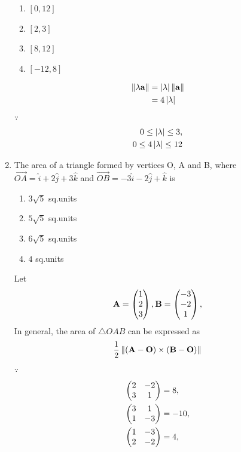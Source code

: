 \documentclass[journal,12pt,twocolumn]{IEEEtran}
\renewcommand\thesection{\arabic{section}}
\begin{document}
\begin{enumerate}[label=\thesection.\arabic*.,ref=\thesection.\theenumi]
\begin{enumerate}
    \item $\left[0,12\right]$
    \item $\left[2,3\right]$
    \item $\left[8,12\right]$
    \item $\left[-12,8\right]$
\end{enumerate}
	 \solution  
\begin{align}
  \left\lVert\lambda \mathbf{a}\right\rVert 
  &= \left\vert\lambda\right\vert \left\lVert\mathbf{a}\right\rVert
  \\
	&= 4\left\vert\lambda\right\vert 
\end{align}
$\because$
\begin{align}
	0 \leq \left\vert\lambda\right\vert \leq 3,  
\\
	0 \leq 4\left\vert\lambda\right\vert \leq 12
\end{align}
\item The area of a triangle formed by vertices O, A and B, where $\overrightarrow{OA}=\hat{i} + 2\hat{j} + 3 \hat{k} $ and $\overrightarrow{OB}=-3\hat{i} - 2\hat{j} +  \hat{k} $ is \\
 \begin{enumerate}
     \item $ 3\sqrt{5} $ sq.units\\
    \item$ 5\sqrt{5} $ sq.units\\
    \item$ 6\sqrt{5} $ sq.units\\
    \item$ 4 $ sq.units
\end{enumerate}
\solution Let
		\begin{align}
			\mathbf{A} = \begin{pmatrix}1 \\ 2 \\ 3\end{pmatrix},
			\mathbf{B}  = \begin{pmatrix}-3 \\ -2 \\ 1\end{pmatrix},
		\end{align}
In general, the area of $\triangle OAB$ can be expressed as
		\begin{align}
		\frac{1}{2}	\left\lVert\left(\mathbf{A}-\mathbf{O}\right)  \times 
			\left(\mathbf{B}- \mathbf{O}\right)\right\rVert  
		\end{align}
$\because $
		\begin{align}
			\myvec{2 & -2 \\ 3 & 1 } &= 8,
\\
			\myvec{3 & 1 \\ 1 & -3 } &= -10,
			\\
			\myvec{1 & -3 \\ 2 & -2 } &= 4,

\end{align}
\end{enumerate}
\end{document}
